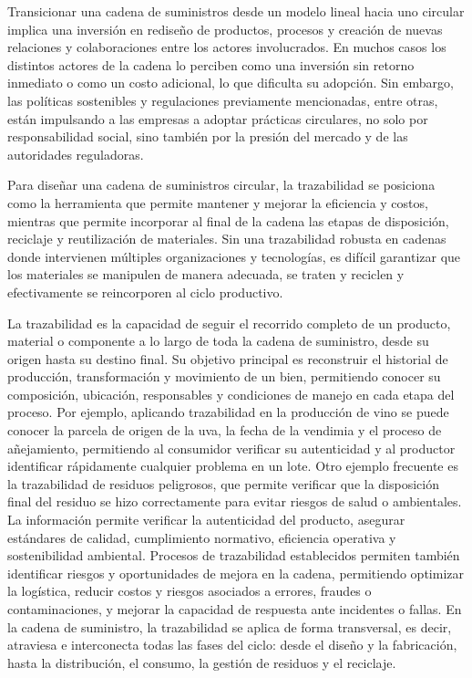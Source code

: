 Transicionar una cadena de suministros desde un modelo lineal hacia uno circular implica una inversión en rediseño de productos, procesos y creación de nuevas relaciones y colaboraciones entre los actores involucrados. En muchos casos los distintos actores de la cadena lo perciben como una inversión sin retorno inmediato o como un costo adicional, lo que dificulta su adopción. Sin embargo, las políticas sostenibles y regulaciones previamente mencionadas, entre otras, están impulsando a las empresas a adoptar prácticas circulares, no solo por responsabilidad social, sino también por la presión del mercado y de las autoridades reguladoras.

Para diseñar una cadena de suministros circular, la trazabilidad se posiciona como la herramienta que permite mantener y mejorar la eficiencia y costos, mientras que permite incorporar al final de la cadena las etapas de disposición, reciclaje y reutilización de materiales. Sin una trazabilidad robusta en cadenas donde intervienen múltiples organizaciones y tecnologías, es difícil garantizar que los materiales se manipulen de manera adecuada, se traten y reciclen y efectivamente se reincorporen al ciclo productivo.

La trazabilidad es la capacidad de seguir el recorrido completo de un producto, material o componente a lo largo de toda la cadena de suministro, desde su origen hasta su destino final. Su objetivo principal es reconstruir el historial de producción, transformación y movimiento de un bien, permitiendo conocer su composición, ubicación, responsables y condiciones de manejo en cada etapa del proceso. Por ejemplo, aplicando trazabilidad en la producción de vino se puede conocer la parcela de origen de la uva, la fecha de la vendimia y el proceso de añejamiento, permitiendo al consumidor verificar su autenticidad y al productor identificar rápidamente cualquier problema en un lote. Otro ejemplo frecuente es la trazabilidad de residuos peligrosos, que permite verificar que la disposición final del residuo se hizo correctamente para evitar riesgos de salud o ambientales. La información permite verificar la autenticidad del producto, asegurar estándares de calidad, cumplimiento normativo, eficiencia operativa y sostenibilidad ambiental. Procesos de trazabilidad establecidos permiten también identificar riesgos y oportunidades de mejora en la cadena, permitiendo optimizar la logística, reducir costos y riesgos asociados a errores, fraudes o contaminaciones, y mejorar la capacidad de respuesta ante incidentes o fallas. En la cadena de suministro, la trazabilidad se aplica de forma transversal, es decir, atraviesa e interconecta todas las fases del ciclo: desde el diseño y la fabricación, hasta la distribución, el consumo, la gestión de residuos y el reciclaje. 


